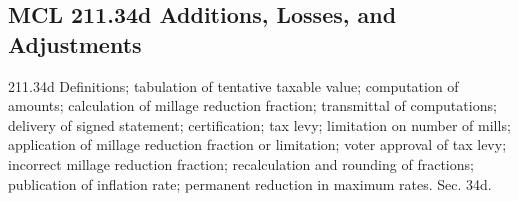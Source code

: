 \documentclass[12pt,\documentclassflag]{michiganCourtOfAppealsBrief}
\begin{document}




\subsection{MCL 211.34d Additions, Losses, and Adjustments}
211.34d Definitions; tabulation of tentative taxable value; computation of amounts; calculation of millage reduction fraction; transmittal of computations; delivery of signed statement; certification; tax levy; limitation on number of mills; application of millage reduction fraction or limitation; voter approval of tax levy; incorrect millage reduction fraction; recalculation and rounding of fractions; publication of inflation rate; permanent reduction in maximum rates.
Sec. 34d.
\end{document}
